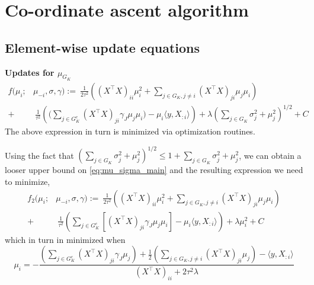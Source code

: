 \documentclass[12pt]{article}
\begin{document}
\section{Co-ordinate ascent algorithm}

\subsection{Element-wise update equations}

\textbf{Updates for $\mu_{G_K}$}
\begin{equation} \label{eq:mu_update}
\begin{aligned}
    f(\mu_i; & \mu_{-i}, \sigma, \gamma) :=\
    \frac{1}{2\tau^2} \left(
	(X^\top X)_{ii} \mu_i^2 + 
	\sum_{j \in G_K, j\neq i} (X^\top X)_{ji} \mu_j \mu_i
    \right) \\
+ &\
    \frac{1}{\tau^2} \left(
	\bigg( \sum_{j \in G_K^c} (X^\top X)_{ji} \gamma_{J} \mu_j \mu_i \bigg) -
	\mu_i \langle y, X_{:i} \rangle   
    \right)
+
    \lambda \left( \sum_{j \in G_K} 
	\sigma_j^2 + \mu_j^2
    \right)^{1/2} + C
\end{aligned}
\end{equation}
The above expression in turn is minimized via optimization routines.

Using the fact that $ \left( \sum_{j \in G_K} \sigma_j^2 + \mu_j^2 \right)^{1/2} \leq 1 + \sum_{j \in G_K} \sigma_j^2 + \mu_j^2 $, we can obtain a looser upper bound on \eqref{eq:mu_sigma_main} and the resulting expression we need to minimize,
\begin{equation}
\begin{aligned}
    f_2(\mu_i; & \mu_{-i}, \sigma, \gamma) :=\
    \frac{1}{2\tau^2} \left(
	(X^\top X)_{ii} \mu_i^2 + 
	\sum_{j \in G_K, j\neq i} (X^\top X)_{ji} \mu_j \mu_i
    \right) \\
+ &\
    \frac{1}{\tau^2} \left(
	\sum_{j \in G_K^c} \left[ (X^\top X)_{ji} \gamma_{J} \mu_j \mu_i \right] -
	\mu_i \langle y, X_{:i} \rangle   
    \right)
+
    \lambda \mu_i^2 + C
\end{aligned}
\end{equation}
which in turn in minimized when
\begin{equation} \label{eq:mu_analytic}
    \mu_i =
    - \frac{
	\left(\sum_{j \in G_K^c} (X^\top X)_{ji} \gamma_{J} \mu_j \right) +
	\frac{1}{2} \left(\sum_{j \in G_K, j\neq i} (X^\top X)_{ji} \mu_j \right)-
	\langle y, X_{:i} \rangle 
    }{
	(X^\top X)_{ii} +
	2 \tau^2 \lambda 
    }
\end{equation}
\end{document}
